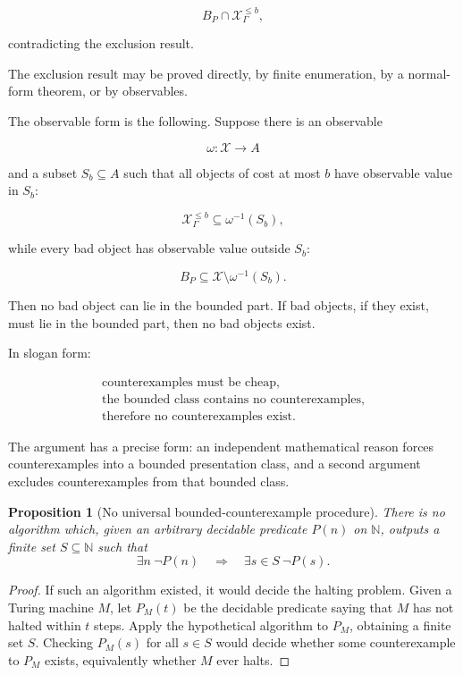 \documentclass[11pt]{article}
\newtheorem{proposition}[theorem]{Proposition}
\begin{document}
\[
B_P\cap \mathcal X_\Gamma^{\leq b},
\]

contradicting the exclusion result.

The exclusion result may be proved directly, by finite enumeration, by a normal-form theorem, or by observables.

The observable form is the following. Suppose there is an observable

\[
\omega:\mathcal X\to A
\]

and a subset \(S_b\subseteq A\) such that all objects of cost at most \(b\) have observable value in \(S_b\):

\[
\mathcal X_\Gamma^{\leq b}\subseteq \omega^{-1}(S_b),
\]

while every bad object has observable value outside \(S_b\):

\[
B_P\subseteq \mathcal X\setminus \omega^{-1}(S_b).
\]

Then no bad object can lie in the bounded part. If bad objects, if they exist, must lie in the bounded part, then no bad objects exist.

In slogan form:

\[
\begin{gathered}
\text{counterexamples must be cheap,}\\
\text{the bounded class contains no counterexamples,}\\
\text{therefore no counterexamples exist.}
\end{gathered}
\]

The argument has a precise form: an independent mathematical reason forces counterexamples into a bounded presentation class, and a second argument excludes counterexamples from that bounded class.


\begin{proposition}[No universal bounded-counterexample procedure]
There is no algorithm which, given an arbitrary decidable predicate \(P(n)\) on \(\mathbb N\), outputs a finite set \(S\subseteq\mathbb N\) such that
\[
\exists n\ \neg P(n)
\quad\Longrightarrow\quad
\exists s\in S\ \neg P(s).
\]
\end{proposition}

\begin{proof}
If such an algorithm existed, it would decide the halting problem. Given a Turing machine \(M\), let \(P_M(t)\) be the decidable predicate saying that \(M\) has not halted within \(t\) steps. Apply the hypothetical algorithm to \(P_M\), obtaining a finite set \(S\). Checking \(P_M(s)\) for all \(s\in S\) would decide whether some counterexample to \(P_M\) exists, equivalently whether \(M\) ever halts.
\end{proof}
\end{document}
